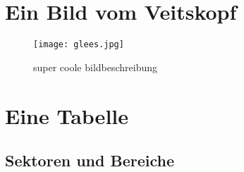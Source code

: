 \documentclass{article}%
\begin{document}
%
\normalsize%
\section{Ein Bild vom Veitskopf}%
\label{sec:EinBildvomVeitskopf}%


\begin{figure}[h!]%
\centering%
\texttt{[image: glees.jpg]}%
\caption{super coole bildbeschreibung}%
\end{figure}

%
\section{Eine Tabelle}%
\label{sec:EineTabelle}%
\subsection{Sektoren und Bereiche}%
\label{subsec:SektorenundBereiche}%
\end{document}
